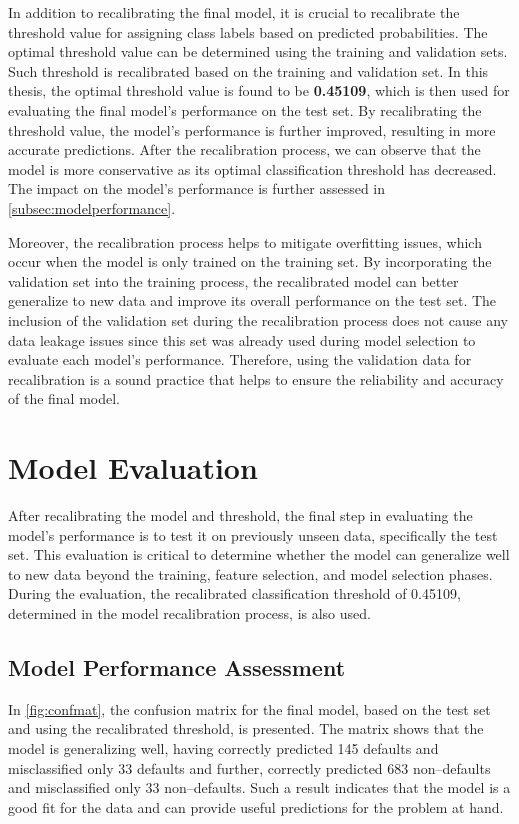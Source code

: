 In addition to recalibrating the final model, it is crucial to recalibrate the threshold value for assigning class labels based on predicted probabilities. The optimal threshold value can be determined using the training and validation sets. Such threshold is recalibrated based on the training and validation set.
In this thesis, the optimal threshold value is found to be \textbf{0.45109}, which is then used for evaluating the final model's performance on the test set.
By recalibrating the threshold value, the model's performance is further improved, resulting in more accurate predictions. After the recalibration process, we can observe that the model is more conservative as its optimal classification threshold has decreased. The impact on the model's performance is further assessed in \autoref{subsec:modelperformance}.

Moreover, the recalibration process helps to mitigate overfitting issues, which occur when the model is only trained on the training set.
By incorporating the validation set into the training process, the recalibrated model can better generalize to new data and improve its overall performance on the test set.
The inclusion of the validation set during the recalibration process does not cause any data leakage issues since this set was already used during model selection to evaluate each model's performance.
Therefore, using the validation data for recalibration is a sound practice that helps to ensure the reliability and accuracy of the final model.

\newpage
\section{Model Evaluation}
After recalibrating the model and threshold, the final step in evaluating the model's performance is to test it on previously unseen data, specifically the test set.
This evaluation is critical to determine whether the model can generalize well to new data beyond the training, feature selection, and model selection phases.
During the evaluation, the recalibrated classification threshold of 0.45109, determined in the model recalibration process, is also used.
\subsection{Model Performance Assessment}
\label{subsec:modelperformance}



In \autoref{fig:confmat}, the confusion matrix for the final model, based on the test set and using the recalibrated threshold, is presented. The matrix shows that the model is generalizing well, having correctly predicted 145 defaults and misclassified only 33 defaults and further, correctly predicted 683 non--defaults and misclassified only 33 non--defaults. Such a result indicates that the model is a good fit for the data and can provide useful predictions for the problem at hand.

